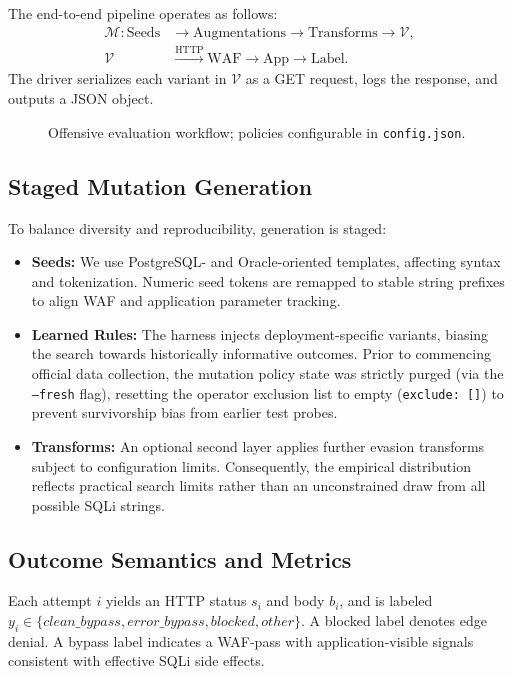 The end-to-end pipeline operates as follows:
\begin{equation}
\label{eq:attack-pipeline}
\begin{aligned}
\mathcal{M}: \text{Seeds} &\rightarrow \text{Augmentations} \rightarrow \text{Transforms} \rightarrow \mathcal{V}, \\
\mathcal{V} &\xrightarrow{\text{HTTP}} \text{WAF} \rightarrow \text{App} \rightarrow \text{Label}.
\end{aligned}
\end{equation}
The driver serializes each variant in $\mathcal{V}$ as a GET request, logs the response, and outputs a JSON object.

\begin{figure}[t]
  \centering
  \caption{Offensive evaluation workflow; policies configurable in \texttt{config.json}.}
  \label{fig:pipeline}
\end{figure}

\subsection{Staged Mutation Generation}
To balance diversity and reproducibility, generation is staged:
\begin{itemize}
  \item \textbf{Seeds:} We use PostgreSQL- and Oracle-oriented templates, affecting syntax and tokenization. Numeric seed tokens are remapped to stable string prefixes to align WAF and application parameter tracking.
  \item \textbf{Learned Rules:} The harness injects deployment-specific variants, biasing the search towards historically informative outcomes. Prior to commencing official data collection, the mutation policy state was strictly purged (via the \texttt{--fresh} flag), resetting the operator exclusion list to empty (\texttt{exclude: []}) to prevent survivorship bias from earlier test probes.
  \item \textbf{Transforms:} An optional second layer applies further evasion transforms subject to configuration limits. Consequently, the empirical distribution reflects practical search limits rather than an unconstrained draw from all possible SQLi strings.
\end{itemize}

\subsection{Outcome Semantics and Metrics}
Each attempt $i$ yields an HTTP status $s_i$ and body $b_i$, and is labeled $y_i \in \{clean\_bypass, error\_bypass, blocked, other\}$. A blocked label denotes edge denial. A bypass label indicates a WAF-pass with application-visible signals consistent with effective SQLi side effects.


